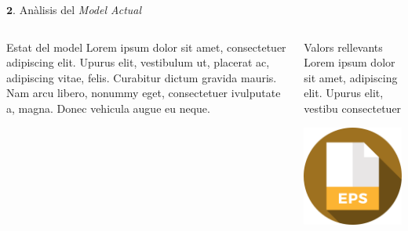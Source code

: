 \documentclass[twocolumn]{beamer}
\begin{document}
\begin{frame}{$\mathbf 2.$ Anàlisis del \textit{Model Actual}}
\begin{columns}[t]
	\begin{column}{.5\textwidth}
		\begin{block}{Estat del model}
			Lorem ipsum dolor sit amet,
			consectetuer adipiscing elit. Upurus elit, vestibulum ut,
			placerat ac, adipiscing vitae,
			felis. Curabitur dictum gravida
			mauris. Nam arcu libero,
			nonummy eget, consectetuer ivulputate a, magna. Donec
			vehicula augue eu neque.
		\end{block}
	\end{column}
	\begin{column}{.5\textwidth}
		\begin{block}{Valors rellevants}
			Lorem ipsum dolor sit amet,
			adipiscing elit. Upurus elit, vestibu
			consectetuer 
		\end{block}
		\includegraphics[width=3.5cm]{eps}
	\end{column}
\end{columns}
\end{frame}
\end{document}
